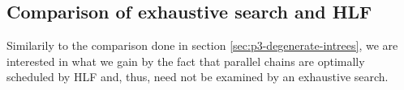   




\subsection{Comparison of exhaustive search and HLF}
\label{sec:parallel-chains-benchmarking}

Similarily to the comparison done in section \ref{sec:p3-degenerate-intrees}, we are interested in what we gain by the fact that parallel chains are optimally scheduled by HLF and, thus, need not be examined by an exhaustive search. 

